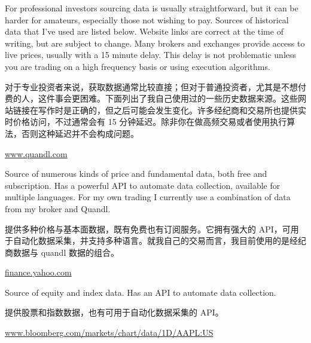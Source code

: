 
\begin{englishblock} For professional investors sourcing data is usually straightforward, but it can be harder for amateurs, especially those not wishing to pay. Sources of historical data that I've used are listed below. Website links are correct at the time of writing, but are subject to change. Many brokers and exchanges provide access to live prices, usually with a 15 minute delay. This delay is not problematic unless you are trading on a high frequency basis or using execution algorithms. \end{englishblock}

\begin{chineseblock}对于专业投资者来说，获取数据通常比较直接；但对于普通投资者，尤其是不想付费的人，这件事会更困难。下面列出了我自己使用过的一些历史数据来源。这些网站链接在写作时是正确的，但之后可能会发生变化。许多经纪商和交易所也提供实时价格访问，不过通常会有 15 分钟延迟。除非你在做高频交易或者使用执行算法，否则这种延迟并不会构成问题。\end{chineseblock}

\url{www.quandl.com}

\begin{englishblock} Source of numerous kinds of price and fundamental data, both free and subscription. Has a powerful API to automate data collection, available for multiple languages. For my own trading I currently use a combination of data from my broker and Quandl. \end{englishblock}

\begin{chineseblock}提供多种价格与基本面数据，既有免费也有订阅服务。它拥有强大的 API，可用于自动化数据采集，并支持多种语言。就我自己的交易而言，我目前使用的是经纪商数据与 quandl 数据的组合。\end{chineseblock}

\url{finance.yahoo.com}

\begin{englishblock} Source of equity and index data. Has an API to automate data collection. \end{englishblock}

\begin{chineseblock}提供股票和指数数据，也有可用于自动化数据采集的 API。 \end{chineseblock}

\url{www.bloomberg.com/markets/chart/data/1D/AAPL:US}

